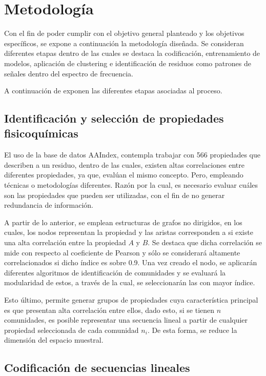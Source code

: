 \section{Metodología}

Con el fin de poder cumplir con el objetivo general planteado y los objetivos específicos, se expone a continuación la metodología diseñada. Se consideran diferentes etapas dentro de las cuales se destaca la codificación, entrenamiento de modelos, aplicación de clustering e identificación de residuos como patrones de señales dentro del espectro de frecuencia.

A continuación de exponen las diferentes etapas asociadas al proceso.

\subsection{Identificación y selección de propiedades fisicoquímicas}

El uso de la base de datos AAIndex, contempla trabajar con 566 propiedades que describen a un residuo, dentro de las cuales, existen altas correlaciones entre diferentes propiedades, ya que, evalúan el mismo concepto. Pero, empleando técnicas o metodologías diferentes. Razón por la cual, es necesario evaluar cuáles son las propiedades que pueden ser utilizadas, con el fin de no generar redundancia de información.

A partir de lo anterior, se emplean estructuras de grafos no dirigidos, en los cuales, los nodos representan la propiedad y las aristas corresponden a si existe una alta correlación entre la propiedad $A$ y $B$. Se destaca que dicha correlación se mide con respecto al coeficiente de Pearson y sólo se considerará altamente correlacionados si dicho índice es sobre 0.9. Una vez creado el nodo, se aplicarán diferentes algoritmos de identificación de comunidades y se evaluará la modularidad de estos, a través de la cual, se seleccionarán las con mayor índice.

Esto último, permite generar grupos de propiedades cuya característica principal es que presentan alta correlación entre ellos, dado esto, si se tienen $n$ comunidades, es posible representar una secuencia lineal a partir de cualquier propiedad seleccionada de cada comunidad $n_i$. De esta forma, se reduce la dimensión del espacio muestral.

\subsection{Codificación de secuencias lineales}

